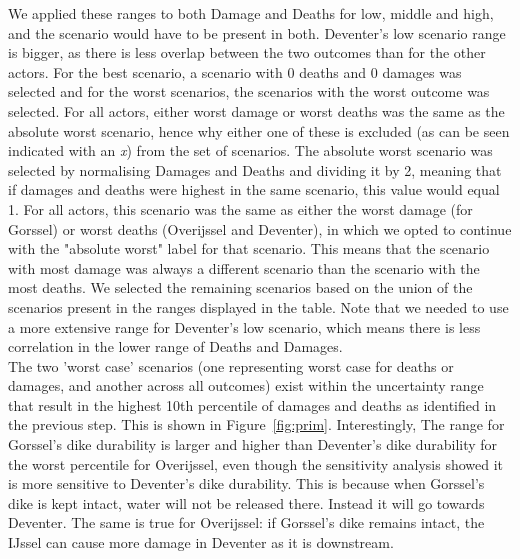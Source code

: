 \noindent We applied these ranges to both Damage and Deaths for low, middle and high, and the scenario would have to be present in both. Deventer's low scenario range is bigger, as there is less overlap between the two outcomes than for the other actors. For the best scenario, a scenario with 0 deaths and 0 damages was selected and for the worst scenarios, the scenarios with the worst outcome was selected. For all actors, either worst damage or worst deaths was the same as the absolute worst scenario, hence why either one of these is excluded (as can be seen indicated with an \emph{x}) from the set of scenarios. The absolute worst scenario was selected by normalising Damages and Deaths and dividing it by 2, meaning that if damages and deaths were highest in the same scenario, this value would equal 1. For all actors, this scenario was the same as either the worst damage (for Gorssel) or worst deaths (Overijssel and Deventer), in which we opted to continue with the "absolute worst" label for that scenario. This means that the scenario with most damage was always a different scenario than the scenario with the most deaths. We selected the remaining scenarios based on the union of the scenarios present in the ranges displayed in the table. Note that we needed to use a more extensive range for Deventer's low scenario, which means there is less correlation in the lower range of Deaths and Damages. \\ 

\noindent The two 'worst case' scenarios (one representing worst case for deaths or damages, and another across all outcomes) exist within the uncertainty range that result in the highest 10th percentile of damages and deaths as identified in the previous step. This is shown in Figure~\ref{fig:prim}. Interestingly, The range for Gorssel's dike durability is larger and higher than Deventer's dike durability for the worst percentile for Overijssel, even though the sensitivity analysis showed it is more sensitive to Deventer's dike durability. This is because when Gorssel's dike is kept intact,  water will not be released there. Instead it will go towards Deventer. The same is true for Overijssel: if Gorssel's dike remains intact, the IJssel can cause more damage in Deventer as it is downstream.

